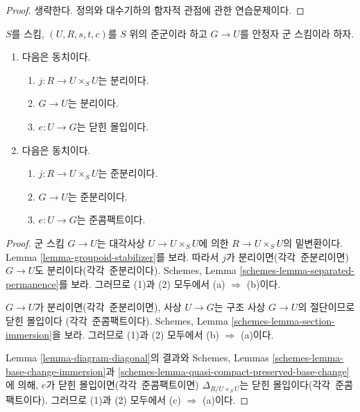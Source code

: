 \begin{proof}
생략한다. 정의와 대수기하의 함자적 관점에 관한 연습문제이다.
\end{proof}

\begin{lemma}
\label{lemma-diagonal}
$S$를 스킴, $(U, R, s, t, c)$를 $S$ 위의 준군이라 하고 $G \to U$를 안정자 군 스킴이라 하자.
\begin{enumerate}
\item 다음은 동치이다.
\begin{enumerate}
\item $j : R \to U \times_S U$는 분리이다.
\item $G \to U$는 분리이다.
\item $e : U \to G$는 닫힌 몰입이다.
\end{enumerate}
\item 다음은 동치이다.
\begin{enumerate}
\item $j : R \to U \times_S U$는 준분리이다.
\item $G \to U$는 준분리이다.
\item $e : U \to G$는 준콤팩트이다.
\end{enumerate}
\end{enumerate}
\end{lemma}

\begin{proof}
군 스킴 $G \to U$는 대각사상 $U \to U \times_S U$에 의한 $R \to U \times_S U$의 밑변환이다.
Lemma \ref{lemma-groupoid-stabilizer}를 보라. 따라서 $j$가 분리이면(각각\ 준분리이면) $G \to U$도
분리이다(각각\ 준분리이다). Schemes, Lemma \ref{schemes-lemma-separated-permanence}를 보라.
그러므로 (1)과 (2) 모두에서 (a) $\Rightarrow$ (b)이다.

\medskip\noindent
$G \to U$가 분리이면(각각\ 준분리이면), 사상 $U \to G$는 구조 사상 $G \to U$의 절단이므로 닫힌 몰입이다
(각각\ 준콤팩트이다). Schemes, Lemma \ref{schemes-lemma-section-immersion}을 보라.
그러므로 (1)과 (2) 모두에서 (b) $\Rightarrow$ (a)이다.

\medskip\noindent
Lemma \ref{lemma-diagram-diagonal}의 결과와 Schemes, Lemmas
\ref{schemes-lemma-base-change-immersion}과 \ref{schemes-lemma-quasi-compact-preserved-base-change}에 의해,
$e$가 닫힌 몰입이면(각각\ 준콤팩트이면) $\Delta_{R/U \times_S U}$는 닫힌 몰입이다(각각\ 준콤팩트이다).
그러므로 (1)과 (2) 모두에서 (c) $\Rightarrow$ (a)이다.
\end{proof}









